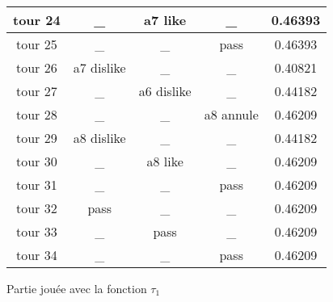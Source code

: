 \documentclass{article}
\begin{document}
\begin{figure}
{\begin{tabular}{|c|c|c|c|c|}
       \hline
       tour 24 & \_ & a7 like & \_ & 0.46393 \\
       \hline
       tour 25 & \_ & \_ & pass & 0.46393 \\
       \hline
       tour 26 & a7 dislike & \_ & \_ & 0.40821 \\
       \hline
       tour 27 & \_ & a6 dislike & \_ & 0.44182 \\
       \hline
       tour 28 & \_ & \_ & a8 annule & 0.46209 \\
       \hline
       tour 29 & a8 dislike & \_ & \_ & 0.44182 \\
       \hline
       tour 30 & \_ & a8 like & \_ & 0.46209 \\
       \hline
       tour 31 & \_ & \_ & pass & 0.46209 \\
       \hline
       tour 32 & pass & \_ & \_ & 0.46209 \\
       \hline
       tour 33 & \_ & pass & \_ & 0.46209 \\
       \hline
       tour 34 & \_ & \_ & pass & 0.46209 \\
       \hline
       \end{tabular}
       }
       \caption{Partie jouée avec la fonction $\tau_1$}
     \end{figure}
\end{document}
